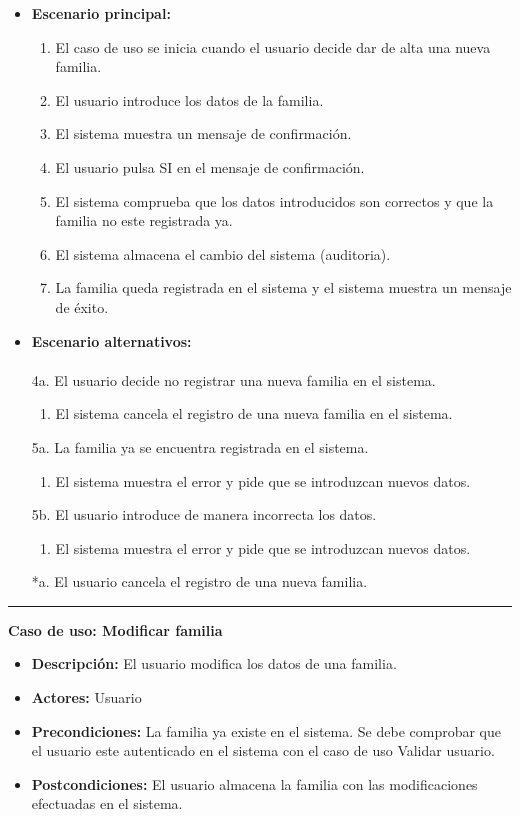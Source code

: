 \begin{itemize}\renewcommand{\labelitemi}{$\circ$}
 \item \textbf{Escenario principal:}
         \begin{enumerate}
          \item El caso de uso se inicia cuando el usuario decide dar de alta una nueva familia.
          \item El usuario introduce los datos de la familia.
	  \item El sistema muestra un mensaje de confirmación.
          \item El usuario pulsa SI en el mensaje de confirmación.
          \item El sistema comprueba que los datos introducidos son correctos y que la familia no este registrada ya.
 	  \item El sistema almacena el cambio del sistema (auditoria).
          \item La familia queda registrada en el sistema y el sistema muestra un mensaje de éxito.
         \end{enumerate}
  \item \textbf{Escenario alternativos:}\\\\
	4a. El usuario decide no registrar una nueva familia en el sistema.
	      \begin{enumerate}
	       \item El sistema cancela el registro de una nueva familia en el sistema.
	      \end{enumerate}
         5a. La familia ya se encuentra registrada en el sistema.
	      \begin{enumerate}
	       \item El sistema muestra el error y pide que se introduzcan nuevos datos.
	      \end{enumerate}
           5b. El usuario introduce de manera incorrecta los datos.
		\begin{enumerate}
		 \item El sistema muestra el error y pide que se introduzcan nuevos datos.
		\end{enumerate}
         *a. El usuario cancela el registro de una nueva familia.
\end{itemize}
\smallskip
\hrule height 1pt
\smallskip
\textbf{Caso de uso: Modificar familia}
\begin{itemize}\renewcommand{\labelitemi}{$\cdot$}
 \item \textbf{Descripción:} El usuario modifica los datos de una familia.
  \item \textbf{Actores:} Usuario
  \item \textbf{Precondiciones:} La familia ya existe en el sistema. Se debe comprobar que el usuario este autenticado en el sistema con el caso de uso Validar usuario.
  \item \textbf{Postcondiciones:} El usuario almacena la familia con las modificaciones efectuadas en el sistema.
\end{itemize}
